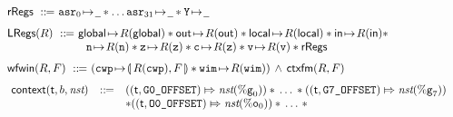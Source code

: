 \begin{figure}[!t]
\[\begin{array}{l}
\begin{array}{lcl}
            \end{array} \\
            \\[-5pt]
            \rRegs \ \define \ \regst{\asr_0}{\notCare} \sepstar \dots 
                        \regst{\asr_{31}}{\notCare} \sepstar \regst{\regY}{\notCare} \\
            \\[-5pt]
            \LRegs{\RFile} \ \define \ \regst{\globalRN}{\RFile(\globalRN)} \sepstar 
            \regst{\outRN}{\RFile(\outRN)} \sepstar \regst{\localRN}{\RFile(\localRN)} 
            \sepstar \regst{\inRN}{\RFile(\inRN)} \sepstar \\
            \hspace*{7em} \regst{\regn}{\RFile(\regn)} \sepstar 
            \regst{\regz}{\RFile(\regz)} \sepstar \regst{\regc}{\RFile(\regz)} 
            \sepstar \regst{\regv}{\RFile(\regv)} \sepstar \rRegs
            \\
            \\[-5pt]
            \wfwin{\RFile}{\Wstack} \ \define \ 
            (\stackAstP{\RFile(\regcwp)}{\Wstack} \sepstar 
                \regst{\regwim}{\RFile(\regwim)}) 
            \, \land \, \ctxfm(\RFile, \Wstack)
            \\
            \\[-5pt]
            \hspace*{-0.15em}
            \begin{array}{lll}
                \relcontext{\thrdid}{\block}{\nst} & \define & 
                (\relmsto{(\thrdid, \ofsGOne)}{\nst(\greg{0})}) 
                \sepstar \, \dots \, \sepstar
                (\relmsto{(\thrdid, \ofsGEig)}{\nst(\greg{7})}) \\
                & & 
                \sepstar
                (\relmsto{(\thrdid, \ofsOOne)}{\nst(\oreg{0})}) 
                \sepstar \, \dots \, \sepstar

\end{array}
\end{array}\]
\end{figure}
